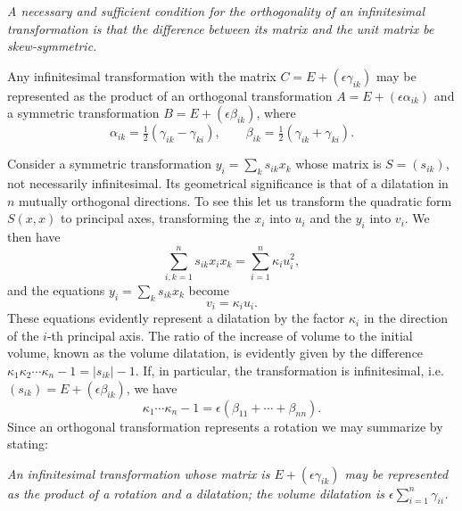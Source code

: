 \emph{A necessary and sufficient condition for the orthogonality of an infinitesimal transformation is that the difference between its matrix and the unit matrix be skew-symmetric.}

Any infinitesimal transformation with the matrix $C=E+(\epsilon\gamma_{ik})$ may be represented as the product of an orthogonal transformation $A=E+(\epsilon\alpha_{ik})$ and a symmetric transformation $B=E+(\epsilon\beta_{ik})$, where
\[\alpha_{ik}=\tfrac12(\gamma_{ik}-\gamma_{ki}),\qquad \beta_{ik}=\tfrac12(\gamma_{ik}+\gamma_{ki}).\]

Consider a symmetric transformation $y_i=\sum_k s_{ik}x_k$ whose matrix is $S=(s_{ik})$, not necessarily infinitesimal. Its geometrical significance is that of a dilatation in $n$ mutually orthogonal directions. To see this let us transform the quadratic form $S(x,x)$ to principal axes, transforming the $x_i$ into $u_i$ and the $y_i$ into $v_i$. We then have
\[\sum_{i,k=1}^{n}s_{ik}x_ix_k=\sum_{i=1}^{n}\kappa_i u_i^2,\]
and the equations $y_i=\sum_k s_{ik}x_k$ become
\[v_i=\kappa_i u_i.\]
These equations evidently represent a dilatation by the factor $\kappa_i$ in the direction of the $i$-th principal axis. The ratio of the increase of volume to the initial volume, known as the volume dilatation, is evidently given by the difference $\kappa_1\kappa_2\cdots\kappa_n-1=|s_{ik}|-1$. If, in particular, the transformation is infinitesimal, i.e. $(s_{ik})=E+(\epsilon\beta_{ik})$, we have
\[\kappa_1\cdots\kappa_n-1=\epsilon(\beta_{11}+\cdots+\beta_{nn}).\]
Since an orthogonal transformation represents a rotation we may summarize by stating:

\emph{An infinitesimal transformation whose matrix is $E+(\epsilon\gamma_{ik})$ may be represented as the product of a rotation and a dilatation; the volume dilatation is $\epsilon\sum_{i=1}^{n}\gamma_{ii}$.}

